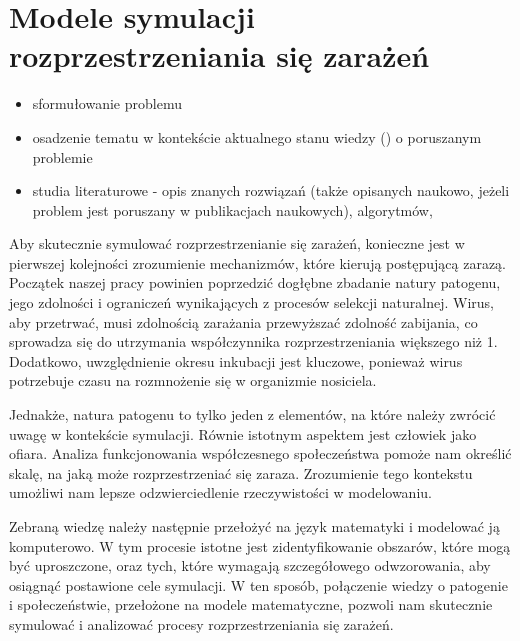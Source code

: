 \chapter{Modele symulacji rozprzestrzeniania się zarażeń}

\begin{itemize}
\item sformułowanie problemu
\item osadzenie tematu w kontekście aktualnego stanu wiedzy () o poruszanym problemie
\item  studia literaturowe \cite{bib:artykul,bib:ksiazka,bib:konferencja,bib:internet} -  opis znanych rozwiązań (także opisanych naukowo, jeżeli problem jest poruszany w publikacjach naukowych), algorytmów, 
\end{itemize}

Aby skutecznie symulować rozprzestrzenianie się zarażeń, konieczne jest w pierwszej kolejności zrozumienie mechanizmów, które kierują postępującą zarazą. Początek naszej pracy powinien poprzedzić dogłębne zbadanie natury patogenu, jego zdolności i ograniczeń wynikających z procesów selekcji naturalnej. Wirus, aby przetrwać, musi zdolnością zarażania przewyższać zdolność zabijania, co sprowadza się do utrzymania współczynnika rozprzestrzeniania większego niż 1. Dodatkowo, uwzględnienie okresu inkubacji jest kluczowe, ponieważ wirus potrzebuje czasu na rozmnożenie się w organizmie nosiciela.

Jednakże, natura patogenu to tylko jeden z elementów, na które należy zwrócić uwagę w kontekście symulacji. Równie istotnym aspektem jest człowiek jako ofiara. Analiza funkcjonowania współczesnego społeczeństwa pomoże nam określić skalę, na jaką może rozprzestrzeniać się zaraza. Zrozumienie tego kontekstu umożliwi nam lepsze odzwierciedlenie rzeczywistości w modelowaniu.

Zebraną wiedzę należy następnie przełożyć na język matematyki i modelować ją komputerowo. W tym procesie istotne jest zidentyfikowanie obszarów, które mogą być uproszczone, oraz tych, które wymagają szczegółowego odwzorowania, aby osiągnąć postawione cele symulacji. W ten sposób, połączenie wiedzy o patogenie i społeczeństwie, przełożone na modele matematyczne, pozwoli nam skutecznie symulować i analizować procesy rozprzestrzeniania się zarażeń. 

